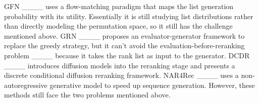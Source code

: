 GFN ____ uses a flow-matching paradigm that maps the list generation probability with its utility. Essentially it is still studying list distributions rather than directly modeling the permutation space, so it still has the challenge mentioned above. GRN ____ proposes an evaluator-generator framework to replace the greedy strategy, but it can't avoid the evaluation-before-reranking problem ____ because it takes the rank list as input to the generator. DCDR ____ introduces diffusion models into the reranking stage and presents a discrete conditional diffusion reranking framework. NAR4Rec ____ uses a non-autoregressive generative model to speed up sequence generation. However, these methods still face the two problems mentioned above.